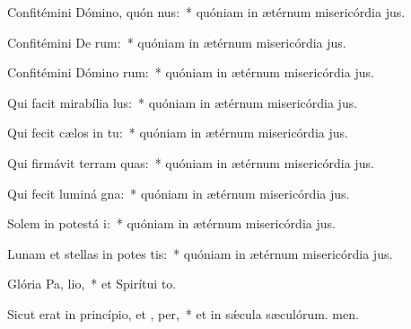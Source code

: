 \item Confitémini Dómino, quón nus:~* quóniam in ætérnum misericórdia jus.
\item Confitémini De rum:~* quóniam in ætérnum misericórdia jus.
\item Confitémini Dómino rum:~* quóniam in ætérnum misericórdia jus.
\item Qui facit mirabília  lus:~* quóniam in ætérnum misericórdia jus.
\item Qui fecit cælos in tu:~* quóniam in ætérnum misericórdia jus.
\item Qui firmávit terram  quas:~* quóniam in ætérnum misericórdia jus.
\item Qui fecit luminá gna:~* quóniam in ætérnum misericórdia jus.
\item Solem in potestá i:~* quóniam in ætérnum misericórdia jus.
\item Lunam et stellas in potes tis:~* quóniam in ætérnum misericórdia jus.
\item Glória Pa,  lio,~* et Spirítui to.
\item Sicut erat in princípio, et ,  per,~* et in sǽcula sæculórum. men.
